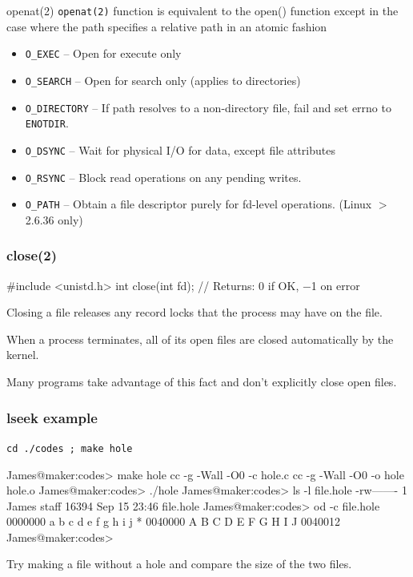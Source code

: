 \documentclass[newPxFont,sthlmFooter,nooffset]{beamer}
\begin{document}
\begin{frame}[t]{openat(2)}
\texttt{openat(2)} function is equivalent to the open() function except in the case where the path specifies a relative path in an atomic fashion
\bigskip


\begin{itemize}
	\item \texttt{O\_EXEC} -- Open for execute only
	\item \texttt{O\_SEARCH} -- Open for search only (applies to directories)
	\item \texttt{O\_DIRECTORY} -- If path resolves to a non-directory file, fail and set errno to \texttt{ENOTDIR}.
	\item \texttt{O\_DSYNC} -- Wait for physical I/O for data, except
file attributes
	\item \texttt{O\_RSYNC} -- Block read operations on any pending writes.
	\item \texttt{O\_PATH} -- Obtain a file descriptor purely for fd-level operations. (Linux $>$2.6.36 only)
\end{itemize}
\end{frame}

\begin{frame}[containsverbatim,t]
  \frametitle{close(2)}

\begin{codedef}
#include <unistd.h> 
int close(int fd);   // Returns: 0 if OK, −1 on error
\end{codedef}

Closing a file releases any record locks that the process may have on the file. 


When a process terminates, all of its open files are closed automatically by the kernel. 
\bigskip

Many programs take advantage of this fact and don’t explicitly close open files. 
\bigskip



\end{frame}

\begin{frame}[containsverbatim,t]
  \frametitle{lseek example}

\texttt{cd ./codes ; make hole}

\begin{codedef}
James@maker:codes> make hole
cc -g -Wall -O0 -c hole.c
cc -g -Wall -O0 -o hole hole.o
James@maker:codes> ./hole
James@maker:codes> ls -l file.hole
-rw-------  1 James  staff  16394 Sep 15 23:46 file.hole
James@maker:codes> od -c file.hole
0000000     a    b    c    d    e    f    g    h    i    j  \0  \0  \0  \0  \0     \0  \0  \0  \0  \0  \0  \0  \0  \0  \0  \0  \0  \0  \0  \0  \0
*
0040000    A   B   C   D   E   F   G   H   I   J
0040012
James@maker:codes>
\end{codedef}

\bigskip
Try making a file without a hole and compare the size of the two files.

\end{frame}
\end{document}
